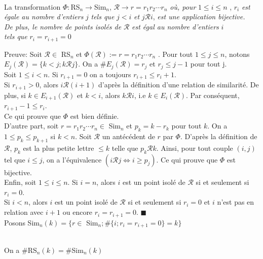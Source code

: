 \begin{proposition} \label{Phi_bijection} \text{ }\\
	La transformation $\Phi: $\rm{RS}$_{n} \rightarrow $\rm{Sim}$_{n}$, $\mathcal{R} \rightarrow r = r_{1}r_{2}\cdots r_{n}$ \textit{ où, pour }$1\leq i \leq n$ , $r_{i}$ \textit{est égale au nombre d'entiers} $j$ \textit{tels que} $j<i$ \textit{et} $j\mathcal{R}i$, \textit{est une application bijective.}\\ \textit{De plus, le nombre de points isolés de} $\mathcal{R}$ \textit{est égal au nombre d'entiers} $i$ \\\textit{tels que} $r_{i}=r_{i+1}=0$ %
\end{proposition}
Preuve:
Soit $\mathcal{R} \in $\rm{ RS}$_{n}$ et $\Phi(\mathcal{R}):= r = r_{1}r_{2}\cdots r_{n}$ . Pour tout $1\leq j \leq n$, notons $E_{j}(\mathcal{R})=\{k<j; k \mathcal{R} j \}$. On a $\# E_{j}(\mathcal{R})=r_{j}$ et $r_{j}\leq j-1$ pour tout j.\\ Soit $1\leq i < n$. Si $r_{i+1}=0$ on a toujours $r_{i+1}\leq r_{i}+1$.\\
Si $r_{i+1}>0$, alors $i\mathcal{R}(i+1)$ d'après la définition d'une relation de similarité. De plus, si $k\in E_{i+1}(\mathcal{R})$ et $k<i$, alors $k\mathcal{R}i$, i.e $k\in E_{i}(\mathcal{R})$. Par conséquent, $r_{i+1}-1 \leq r_{i}$. \\Ce qui prouve que $\Phi$ est bien définie.\vspace{5pt}\\
D'autre part, soit $r=r_{1}r_{2}\cdots r_{n}\in $\rm{ Sim}$_{n}$ et $p_{k}=k-r_{k}$ pour tout $k$. On a $1\leq p_{k}\leq p_{k+1}$ si $k<n$.
Soit $\mathcal{R}$ un antécédent de $r$ par $\Phi$. D'après la définition de $\mathcal{R}$, $p_{k}$ est la plus petite lettre $\leq k$ telle que $p_{k}\mathcal{R}k$. Ainsi, pour tout couple $(i, j)$ tel que $i\leq j$, on a l'équivalence $(i\mathcal{R}j \iff i \geq p_{j})$. Ce qui prouve que $\Phi$ est bijective.\vspace{10pt}\\
Enfin, soit $1\leq i \leq n$. Si $i=n$, alors $i$ est un point isolé de $\mathcal{R}$ si et seulement si $r_{i}=0$.\\
Si $i<n$, alors $i$ est un point isolé de $\mathcal{R}$ si et seulement si $r_{i}=0$ et $i$ n'est pas en relation avec $i+1$ ou encore $r_{i}=r_{i+1}=0$. $\blacksquare$\\
Posons Sim$_{n}(k)=\{r \in $ Sim$_{n}; \#\{i; r_{i}=r_{i+1}=0\}=k\}$ 
\begin{corollaire} \label{sr_eq_sim} \text{ }\\
	On a $\#$\rm{RS}$_{n}(k) = \#$\rm{Sim}$_{n}(k)$
\end{corollaire}

